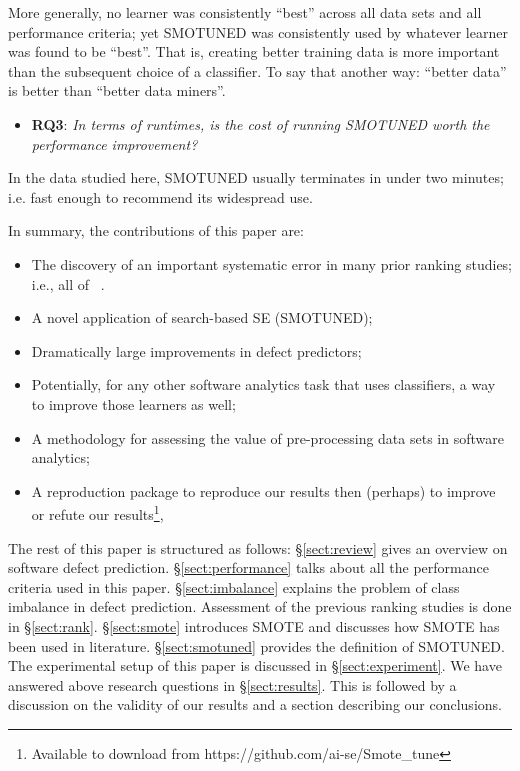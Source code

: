 \documentclass[10pt,conference]{IEEEtran}
\newcommand{\bi}{\begin{itemize}[leftmargin=0.4cm]}
\newcommand{\ei}{\end{itemize}}
\theoremstyle{break}
\theoremstyle{break}
\newcommand{\tion}[1]{{\S}\ref{sect:#1}}
\newcommand{\sma}{{\sc SMOTE}}
\newcommand{\smb}{{\sc SMOTUNED}}
\begin{document}
More generally, no learner was consistently ``best'' across all data sets and all performance criteria; yet {\smb} was consistently  used by  whatever  learner was found to be ``best''.  
That is,  creating better training data is more important
than the subsequent choice of a classifier.  To say that another way: ``better data'' is better than ``better data miners''.
 
  
   \bi
  \item
  \textbf{RQ3}: {\em  In terms of runtimes, is the cost of running {\smb} worth the performance improvement?}
  \ei
  
   \begin{lesson}In the data studied here,
   {\smb} usually terminates in under two minutes; i.e.  fast enough
   to recommend its widespread use.
 \end{lesson}


\noindent
In summary, the  contributions of this paper are:
\bi
\item The discovery of an important systematic error in  many prior ranking studies; i.e., all of
~\cite{lessmann2008benchmarking,hall2012systematic,elish2008predicting,menzies2010defect,gondra2008applying,radjenovic2013software,jiang2008techniques,wang2013using,mende2009revisiting,li2012sample,khoshgoftaar2010attribute,jiang2009variance,ghotra2015revisiting,jiang2008can,tantithamthavorn2016automated,fu2016tuning}.
\item A novel application of search-based SE ({\smb});
\item Dramatically large improvements in  defect predictors;
\item Potentially, for any other software analytics task that uses classifiers, a way to improve those learners as well;
\item A methodology for assessing the value of pre-processing data sets in software analytics;
\item A reproduction package to reproduce our results then (perhaps) to improve or refute  our results\footnote{Available to download from https://github.com/ai-se/Smote\_tune},
\ei
The rest of this paper is structured as follows:
\tion{review} gives an overview on software defect prediction.
\tion{performance} talks about all the performance criteria used in this paper.
\tion{imbalance} explains the problem of class imbalance in defect prediction. Assessment of the previous ranking studies is done in \tion{rank}.
\tion{smote} introduces {\sma} and discusses how {\sma} has been used in literature. \tion{smotuned} provides the definition of {\smb}. The experimental setup of this paper is discussed in \tion{experiment}.
We have answered above research questions in
\tion{results}. This is followed by a discussion on the validity of our results 
and a section describing our conclusions.
 
\end{document}
